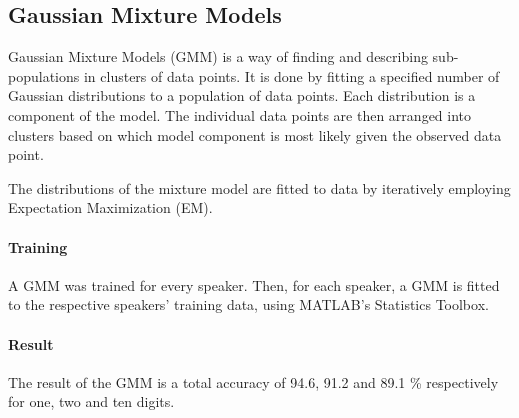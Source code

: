 \subsection*{Gaussian Mixture Models}
Gaussian Mixture Models (GMM) is a way of finding and describing sub-populations in clusters of data points.
It is done by fitting a specified number of Gaussian distributions to a population of data points.
Each distribution is a component of the model. 
The individual data points are then arranged into clusters based on which model component is most likely given the observed data point.

The distributions of the mixture model are fitted to data by iteratively employing Expectation Maximization (EM).

\paragraph*{Training}
A GMM was trained for every speaker.
Then, for each speaker, a GMM is fitted to the respective speakers' training data, using MATLAB's Statistics Toolbox.

\paragraph*{Result}
The result of the GMM is a total accuracy of 94.6, 91.2 and 89.1 \% respectively for one, two and ten digits. 
